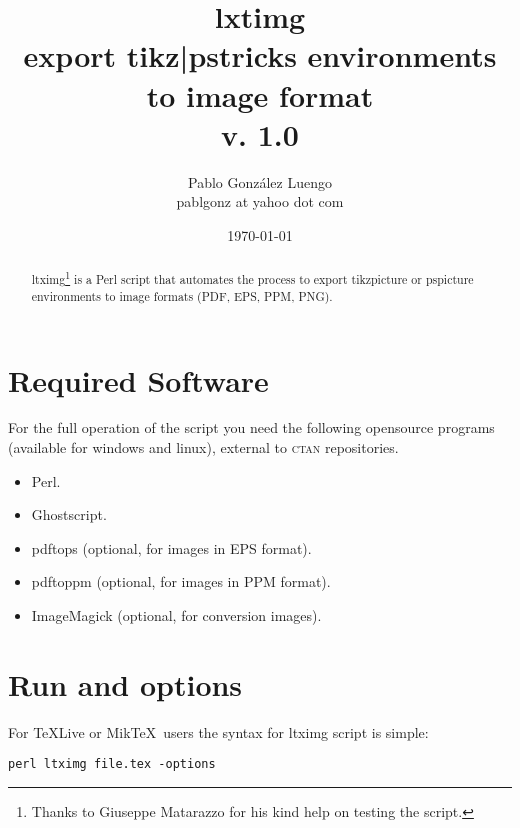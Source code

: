 \documentclass[11pt]{article}
\begin{document}
\title{{\huge\textsf{lxtimg}}\\export tikz|pstricks environments to image format\\  \small v. 1.0}
\author{Pablo Gonz\'{a}lez Luengo\\ \small \ttfamily pablgonz at yahoo dot com}
\date{\today}
\maketitle
\begin{abstract}
\noindent

\textsf{ltximg}\footnote{Thanks to Giuseppe Matarazzo for his kind help on testing the script.} is a \textsf{Perl} script that automates the process to export 
\textsf{tikzpicture} or \textsf{pspicture} environments to image formats (PDF, EPS, PPM, PNG).
\end{abstract}
\tableofcontents
\section{Required Software}

For the full operation of the script you need the following opensource programs
(available for windows and linux), external to \textsc{ctan} repositories.

\begin{itemize}
\item \textsf{Perl}.

\item \textsf{Ghostscript}.

\item \textsf{pdftops} (optional, for images in EPS format).

\item \textsf{pdftoppm} (optional, for images in PPM format).

\item \textsf{ImageMagick} (optional, for conversion images).
\end{itemize}
\newpage
\section{Run and options}
For \TeX Live or Mik\TeX\ users the syntax for \textsf{ltximg} script is simple:

\begin{lstlisting}
perl ltximg file.tex -options
\end{lstlisting}
\end{document}
